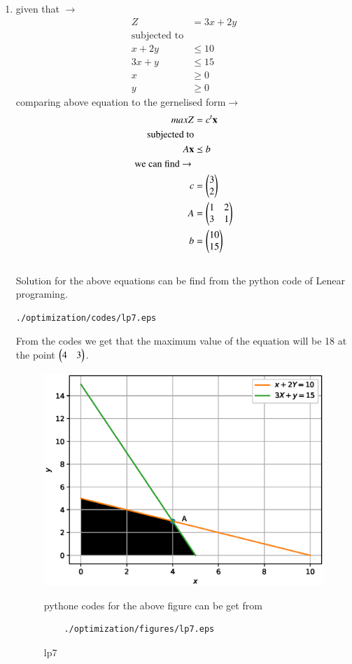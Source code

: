 \renewcommand{\theequation}{\theenumi}
\begin{enumerate}[label=\arabic*.,ref=\thesubsection.\theenumi]
\item  given that $\to$
\begin{align}
Z &= 3x + 2y
\\
\text{subjected to}
\\
x + 2y &\leq 10
\\
3x + y &\leq 15
\\
x  &\geq 0
\\
y &\geq 0
\end{align}
comparing above equation to the gernelised form$\to$ 
\begin{align}
maxZ &= c^t \mathbf{x}
\\
\text{subjected to}
\\
A\mathbf{x} &\preceq b
\\ 
\text{we can find $\to$ }
\\
c &= \begin{pmatrix}3\\ 2\end{pmatrix}
\\
A &= \begin{pmatrix}1 & 2 \\ 3 & 1\end{pmatrix}
\\
b &= \begin{pmatrix}10\\15\end{pmatrix}
\end{align}\\
Solution for the above equations can be find from the python code of Lenear programing.\\
\begin{lstlisting}
./optimization/codes/lp7.eps
\end{lstlisting}

From the codes we get that the maximum value of the equation will be 18 at the point $\begin{pmatrix}4 & 3\end{pmatrix}$.

\begin{figure}[!ht]
	\centering
	\includegraphics[width=\columnwidth]{./figures/lp7.eps}
	\caption{ lp7}
	\label{fig:lp7}
	pythone codes for the above figure can be get from
	\begin{lstlisting}
	./optimization/figures/lp7.eps
	\end{lstlisting}	
\end{figure}

\end{enumerate}
